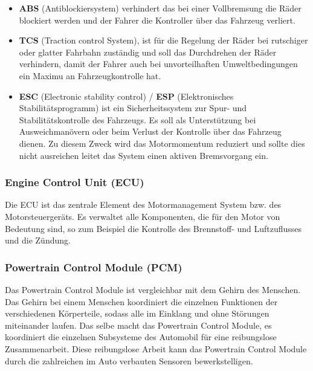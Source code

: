        \begin{itemize}
            \item \textbf{ABS} (Antiblockiersystem) verhindert das bei einer Vollbremsung die Räder
            blockiert werden und der Fahrer die Kontroller über das Fahrzeug verliert.
            ~\cite{antiblockiersys.PB1}

            \item \textbf{TCS} (Traction control System), ist für die Regelung der Räder bei rutschiger oder glatter Fahrbahn zuständig
            und soll das Durchdrehen der Räder verhindern, damit der Fahrer auch bei unvorteilhaften Umweltbedingungen ein
            Maximu an Fahrzeugkontrolle hat.
            ~\cite{tractioncontrol.PB1}

            \item \textbf{ESC} (Electronic stability control) / \textbf{ESP} (Elektronisches Stabilitätsprogramm)
            ist ein Sicherheitssystem zur Spur- und Stabilitätskontrolle des Fahrzeugs.
            Es soll als Unterstützung bei Ausweichmanövern oder beim Verlust der Kontrolle über das Fahrzeug dienen. 
            Zu diesem Zweck wird das Motormomentum reduziert und sollte dies nicht ausreichen leitet das System einen aktiven
            Bremsvorgang ein.
            ~\cite{ESP.PB1}
        \end{itemize}

        \subsubsection{Engine Control Unit (ECU)}
        Die ECU ist das zentrale Element des Motormanagement System bzw. des Motorsteuergeräts. Es verwaltet alle
        Komponenten, die für den Motor von Bedeutung sind, so zum Beispiel die Kontrolle des Brennstoff- und Luftzuflusses und die Zündung.
        ~\cite{enginecontrol.PB1} 

        \subsubsection{Powertrain Control Module (PCM)}
        Das Powertrain Control Module ist vergleichbar mit dem Gehirn des Menschen. Das Gehirn bei einem Menschen
        koordiniert die einzelnen Funktionen der verschiedenen Körperteile, sodass alle im Einklang und ohne
        Störungen miteinander laufen. Das selbe macht das Powertrain Control Module, es koordiniert die einzelnen
        Subsysteme des Automobil für eine reibungslose Zusammenarbeit. Diese reibungslose Arbeit kann das Powertrain
        Control Module durch die zahlreichen im Auto verbauten Sensoren bewerkstelligen.
        ~\cite{PCM.PB1}

